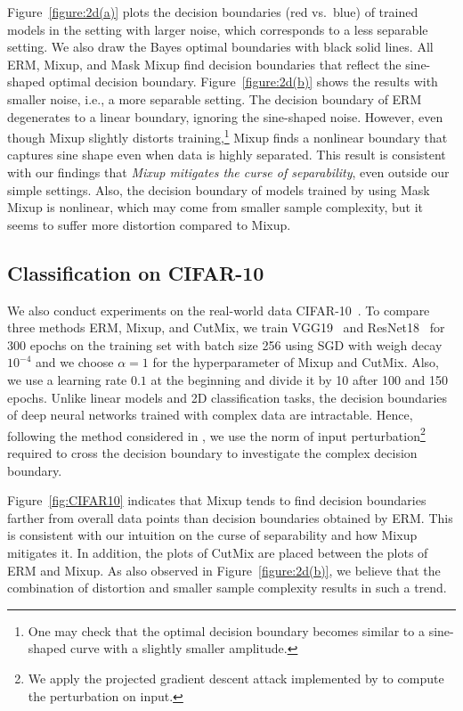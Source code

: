 Figure~\ref{figure:2d(a)} plots the decision boundaries (red vs.\ blue) of trained models in the setting with larger noise, which corresponds to a less separable setting. We also draw the Bayes optimal boundaries with black solid lines.  All ERM, Mixup, and Mask Mixup find decision boundaries that reflect the sine-shaped optimal decision boundary. Figure~\ref{figure:2d(b)} shows the results with smaller noise, i.e., a more separable setting. The decision boundary of ERM degenerates to a linear boundary, ignoring the sine-shaped noise.
However, even though Mixup slightly distorts training,\footnote{
One may check that the optimal decision boundary becomes similar to a sine-shaped curve with a slightly smaller amplitude.} Mixup finds a nonlinear boundary that captures sine shape even when data is highly separated. 
This result is consistent with our findings that \emph{Mixup mitigates the curse of separability}, even outside our simple settings. 
Also, the decision boundary of models trained by using Mask Mixup is nonlinear, which may come from smaller sample complexity, but it  seems to suffer more distortion compared to Mixup.
\vspace{-5pt}
\subsection{Classification on CIFAR-10}
\vspace{-5pt}
We also conduct experiments on the real-world data CIFAR-10~\citep{krizhevsky2009learning}. 
To compare three methods ERM, Mixup, and CutMix, we train VGG19~\citep{simonyan2014very} and ResNet18~\citep{he2016deep} for 300 epochs on the training set with batch size 256 using SGD with weigh decay $10^{-4}$ and we choose $\alpha = 1$ for the hyperparameter of Mixup and CutMix. Also, we use a learning rate $0.1$ at the beginning and divide it by 10 after 100 and 150 epochs. Unlike linear models and 2D classification tasks, the decision boundaries of deep neural networks trained with complex data are intractable. 
Hence, following the method considered in \citet{nar2019cross,pezeshki2021gradient}, we use the norm of input perturbation\footnote{We apply the projected gradient descent attack implemented by \citet{rauber2017foolbox} to compute the perturbation on input. } required to cross the decision boundary to investigate the complex decision boundary. 

Figure~\ref{fig:CIFAR10} indicates that Mixup tends to find decision boundaries farther from overall data points than decision boundaries obtained by ERM. This is consistent with our intuition on the curse of separability and how Mixup mitigates it. In addition, the plots of CutMix are placed between the plots of ERM and Mixup. As also observed in Figure~\ref{figure:2d(b)}, we believe that the combination of distortion and smaller sample complexity results in such a trend.

